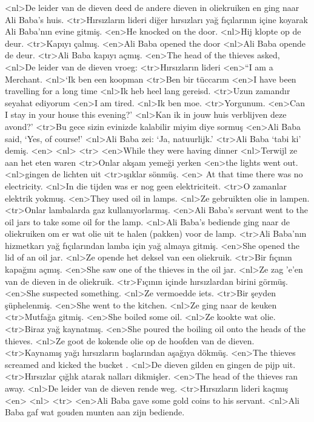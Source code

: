 <nl>De leider van de dieven deed de andere dieven in oliekruiken en ging naar Ali Baba's huis.
<tr>Hırsızların lideri diğer hırsızları yağ fıçılarının içine  koyarak Ali Baba’nın evine gitmiş.
<en>He knocked on the  door. 
<nl>Hij klopte op de deur. 
<tr>Kapıyı çalmış.
<en>Ali Baba opened the door
<nl>Ali Baba opende de deur.
<tr>Ali Baba kapıyı açmış.
<en>The head of the thieves asked, 
<nl>De leider van de dieven vroeg:
<tr>Hırsızların lideri
<en>“I am a Merchant. 
<nl>`Ik ben een koopman 
<tr>Ben bir tüccarım
<en>I have been travelling for a long time 
<nl>Ik heb heel lang gereisd. 
<tr>Uzun zamandır seyahat ediyorum
<en>I am tired. 
<nl>Ik ben moe. 
<tr>Yorgunum.
<en>Can I stay in your house this evening?' 
<nl>Kan ik in jouw huis verblijven deze avond?'
<tr>Bu gece sizin evinizde kalabilir miyim diye sormuş
<en>Ali Baba said, `Yes, of course!' 
<nl>Ali Baba zei: `Ja, natuurlijk.' 
<tr>Ali Baba ‘tabi ki’ demiş.
<en>
<nl>
<tr>
<en>While they were  having dinner 
<nl>Terwijl ze aan het eten waren 
<tr>Onlar akşam yemeği yerken 
<en>the lights went out. 
<nl>gingen de lichten uit
<tr>ışıklar sönmüş.
<en> At that time there was no electricity. 
<nl>In die tijden was er nog geen elektriciteit.
<tr>O zamanlar elektrik yokmuş.
<en>They used oil in lamps. 
<nl>Ze gebruikten olie in lampen.
<tr>Onlar  lambalarda gaz  kullanıyorlarmış.
<en>Ali Baba’s servant went to the oil jars to take some oil for the lamp. 
<nl>Ali Baba's bediende ging naar de oliekruiken om er  wat olie uit te halen (pakken) voor de lamp. 
<tr>Ali Baba’nın hizmetkarı yağ fıçılarından lamba için yağ almaya gitmiş.
<en>She opened the lid of an oil jar. 
<nl>Ze opende het deksel van een oliekruik.
<tr>Bir fıçının kapağını açmış.
<en>She saw one of the thieves in the oil jar. 
<nl>Ze zag 'e'en van de dieven in de oliekruik. 
<tr>Fıçının içinde hırsızlardan birini görmüş.
<en>She suspected something. 
<nl>Ze vermoedde iets. 
<tr>Bir şeyden şüphelenmiş.
<en>She went to the kitchen.
<nl>Ze ging naar de keuken
<tr>Mutfağa gitmiş.
<en>She boiled some oil. 
<nl>Ze kookte wat olie. 
<tr>Biraz yağ kaynatmış.
<en>She poured the boiling oil onto the heads of the thieves.
<nl>Ze goot de kokende olie op de hoofden van de dieven. 
<tr>Kaynamış yağı hırsızların başlarından aşağıya dökmüş.
<en>The thieves screamed and kicked the bucket . 
<nl>De dieven gilden en gingen de pijp uit.
<tr>Hırsızlar çığlık atarak nalları dikmişler.
<en>The head of the thieves ran away. 
<nl>De leider van de dieven rende weg. 
<tr>Hırsızların lideri kaçmış
<en>
<nl>
<tr>
<en>Ali Baba gave some gold coins to his servant.
<nl>Ali Baba gaf wat gouden munten aan zijn bediende.

